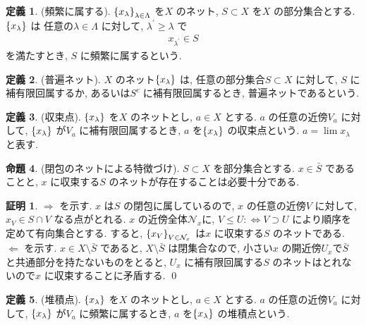 \documentclass[10pt, fleqn, label-section=none]{bxjsarticle}
\theoremstyle{definition}
\newtheorem{dfn}{定義}[section]
\newtheorem{prop}[dfn]{命題}
\newtheorem*{pf*}{証明}
\newcommand{\cbra}[1]{\mleft\{#1\mright\}}
\newcommand{\LR}{\Leftrightarrow}
\newcommand{\naraba}{\Rightarrow}
\newcommand{\gyaku}{\Leftarrow}
\renewcommand{\;}{\, ; \,}
\begin{document}
\begin{dfn}(頻繁に属する). $\cbra{x_\lambda}_{\lambda \in \Lambda}$ を$X$ のネット, $S \subset X$ を$X$ の部分集合とする. $\cbra{x_\lambda}$  は 任意の$\lambda \in \Lambda$ に対して, $\lambda^\prime \geq \lambda $ で
\begin{align*} x_{\lambda^\prime} \in S \end{align*}
を満たすとき, $S$ に頻繁に属するという. 
\end{dfn}

\begin{dfn}(普遍ネット). $X$ のネット$\cbra{x_\lambda}$ は, 任意の部分集合$S \subset X$ に対して, $S$ に補有限回属するか, あるいは$S^c$ に補有限回属するとき, 普遍ネットであるという.  

\end{dfn}

\begin{dfn}(収束点). $\cbra{x_\lambda}$ を$X$ のネットとし, $a \in X$ とする.  $a$ の任意の近傍$V_a$ に対して, $\cbra{x_\lambda}$ が$V_a$ に補有限回属するとき, $a$ を$\cbra{x_\lambda}$ の収束点という. $a = \lim x_\lambda$ と表す. 

\end{dfn}

\begin{prop}(閉包のネットによる特徴づけ). 
$S \subset X$ を部分集合とする. $x \in \bar S$ であることと, $x$ に収束する$S$ のネットが存在することは必要十分である. 
\end{prop}
\begin{pf*}
$\naraba$ を示す. 
$x$ は$S$ の閉包に属しているので, $x$ の任意の近傍$V$ に対して, $x_{V} \in S \cap V$ なる点がとれる. $x$ の近傍全体$\mathcal N _x$に, $V \leq  U :\LR V \supset U$ により順序を定めて有向集合とする. すると, $\cbra{x_V}_{V \in \mathcal N _x}$ は$x$ に収束する$S$ のネットである. $\gyaku$ を示す. $x \in X \setminus  \bar S$ であると, $X \setminus \bar S$ は閉集合なので, 小さい$x$ の開近傍$U_x$で$\bar S$ と共通部分を持たないものをとると, $U_x$ に補有限回属する$S$ のネットはとれないので$x$ に収束することに矛盾する.
\qed
\end{pf*}

\begin{dfn}(堆積点).  $\cbra{x_\lambda}$ を$X$ のネットとし, $a \in X$ とする.  $a$ の任意の近傍$V_a$ に対して, $\cbra{x_\lambda}$ が$V_a$ に頻繁に属するとき, $a$ を$\cbra{x_\lambda}$ の堆積点という. 

\end{dfn}
\end{document}
